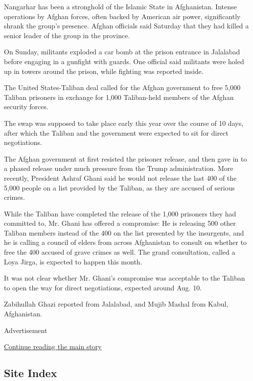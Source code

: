Nangarhar has been a stronghold of the Islamic State in Afghanistan.
Intense operations by Afghan forces, often backed by American air power,
significantly shrank the group's presence. Afghan officials said
Saturday that they had killed a senior leader of the group in the
province.

On Sunday, militants exploded a car bomb at the prison entrance in
Jalalabad before engaging in a gunfight with guards. One official said
militants were holed up in towers around the prison, while fighting was
reported inside.

The United States-Taliban deal called for the Afghan government to free
5,000 Taliban prisoners in exchange for 1,000 Taliban-held members of
the Afghan security forces.

The swap was supposed to take place early this year over the course of
10 days, after which the Taliban and the government were expected to sit
for direct negotiations.

The Afghan government at first resisted the prisoner release, and then
gave in to a phased release under much pressure from the Trump
administration. More recently, President Ashraf Ghani said he would not
release the last 400 of the 5,000 people on a list provided by the
Taliban, as they are accused of serious crimes.

While the Taliban have completed the release of the 1,000 prisoners they
had committed to, Mr. Ghani has offered a compromise: He is releasing
500 other Taliban members instead of the 400 on the list presented by
the insurgents, and he is calling a council of elders from across
Afghanistan to consult on whether to free the 400 accused of grave
crimes as well. The grand consultation, called a Loya Jirga, is expected
to happen this month.

It was not clear whether Mr. Ghani's compromise was acceptable to the
Taliban to open the way for direct negotiations, expected around Aug.
10.

Zabihullah Ghazi reported from Jalalabad, and Mujib Mashal from Kabul,
Afghanistan.

Advertisement

\protect\hyperlink{after-bottom}{Continue reading the main story}

\hypertarget{site-index}{%
\subsection{Site Index}\label{site-index}}

